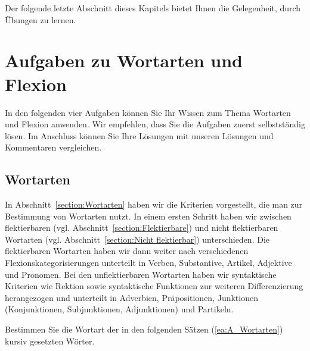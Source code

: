 Der folgende letzte Abschnitt dieses Kapitels bietet Ihnen die Gelegenheit, durch Übungen zu lernen.


\section{Aufgaben zu Wortarten und Flexion}\label{section:Aufgaben_Wort}

In den folgenden vier Aufgaben können Sie Ihr Wissen zum Thema Wortarten und Flexion anwenden. Wir empfehlen, dass Sie die Aufgaben zuerst selbstständig lösen. Im Anschluss können Sie Ihre Lösungen mit unseren Lösungen und Kommentaren vergleichen.


\subsection{Wortarten}\label{subsection:A_Wortarten}

In Abschnitt~\ref{section:Wortarten} haben wir die Kriterien vorgestellt, die man zur Bestimmung von Wortarten nutzt. In einem ersten Schritt haben wir zwischen flektierbaren (vgl. Abschnitt~\ref{section:Flektierbare}) und nicht flektierbaren Wortarten (vgl. Abschnitt~\ref{section:Nicht flektierbar}) unterschieden. Die flektierbaren Wortarten haben wir dann weiter nach verschiedenen Flexionskategorisierungen unterteilt in Verben, Substantive, Artikel, Adjektive und Pronomen. Bei den unflektierbaren Wortarten haben wir syntaktische Kriterien wie Rektion sowie syntaktische Funktionen zur weiteren Differenzierung herangezogen und unterteilt in Adverbien, Präpositionen, Junktionen (Konjunktionen, Subjunktionen, Adjunktionen) und Partikeln. 

Bestimmen Sie die Wortart der in den folgenden Sätzen (\ref{ea:A_Wortarten}) kursiv gesetzten Wörter.

